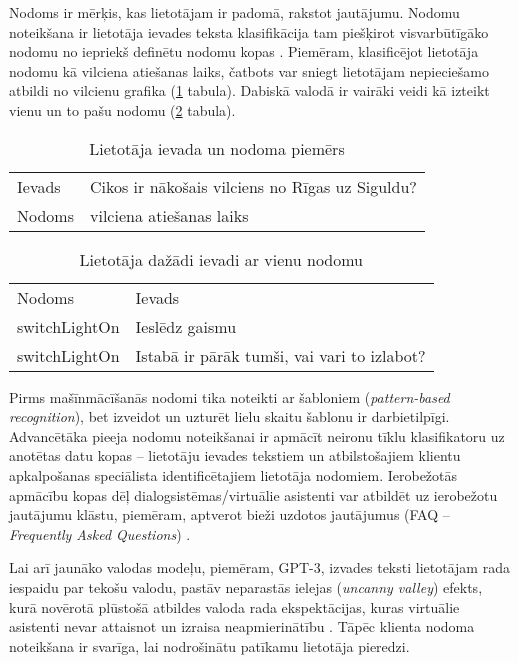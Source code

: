 Nodoms ir mērķis, kas lietotājam ir padomā, rakstot jautājumu. Nodomu noteikšana ir lietotāja ievades teksta klasifikācija tam piešķirot visvarbūtīgāko nodomu no iepriekš definētu nodomu kopas \cite{fasttext2019}. Piemēram, klasificējot lietotāja nodomu kā vilciena atiešanas laiks, čatbots var sniegt lietotājam nepieciešamo atbildi no vilcienu grafika (\ref{tab:input-intent} tabula). Dabiskā valodā ir vairāki veidi kā izteikt vienu un to pašu nodomu (\ref{tab:input-intent-ambiguous} tabula).


\begin{table}[htbp]
	\centering
	\caption{Lietotāja ievada un nodoma piemērs}
	\begin{tabular}{ll}\toprule
		Ievads & Cikos ir nākošais vilciens no Rīgas uz Siguldu? \\
		Nodoms & vilciena atiešanas laiks \\\bottomrule
	\end{tabular}%
	\label{tab:input-intent}%
\end{table}


\begin{table}[htbp]
	\centering
	\caption{Lietotāja dažādi ievadi ar vienu nodomu \cite{snips-docs}}
	\begin{tabular}{ll}\toprule
		Nodoms & Ievads \\
		switchLightOn & Ieslēdz gaismu \\
		switchLightOn & Istabā ir pārāk tumši, vai vari to izlabot? \\\bottomrule
	\end{tabular}%
	\label{tab:input-intent-ambiguous}%
\end{table}

Pirms mašīnmācīšanās nodomi tika noteikti ar šabloniem (\textit{pattern-based recognition}), bet izveidot un uzturēt lielu skaitu šablonu ir darbietilpīgi. Advancētāka pieeja nodomu noteikšanai ir apmācīt neironu tīklu klasifikatoru uz anotētas datu kopas -- lietotāju ievades tekstiem un atbilstošajiem klientu apkalpošanas speciālista identificētajiem lietotāja nodomiem. Ierobežotās apmācību kopas dēļ dialogsistēmas/virtuālie asistenti var atbildēt uz ierobežotu jautājumu klāstu, piemēram, aptverot bieži uzdotos jautājumus (FAQ -- \textit{Frequently Asked Questions}) \cite{fasttext2019}.

Lai arī jaunāko valodas modeļu, piemēram, GPT-3, izvades teksti lietotājam rada iespaidu par tekošu valodu, pastāv neparastās ielejas (\textit{uncanny valley}) efekts, kurā novērotā plūstošā atbildes valoda rada ekspektācijas, kuras virtuālie asistenti nevar attaisnot un izraisa neapmierinātību \cite{paikens2020}. Tāpēc klienta nodoma noteikšana ir svarīga, lai nodrošinātu patīkamu lietotāja pieredzi.

